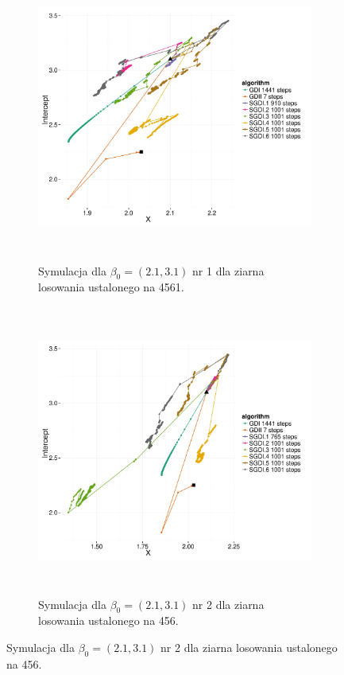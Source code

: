\begin{figure}[hbt!]
  \begin{center}
   \begin{subfigure}[h!]{0.9\textwidth}
      \includegraphics[width=\textwidth, height=270pt]{Obrazki/sgd_21_31_1.pdf}
      \caption{Symulacja dla $\beta_0 = (2.1,3.1)$ nr 1 dla ziarna losowania ustalonego na 4561.}
   \end{subfigure}     
   \begin{subfigure}[h!]{0.9\textwidth}
      \includegraphics[width=\textwidth, height=270pt]{Obrazki/sgd_21_31_2.pdf}
      \caption{Symulacja dla $\beta_0 = (2.1,3.1)$ nr 2 dla ziarna losowania ustalonego na 456.}
   \end{subfigure}  \end{center}

\end{figure}
